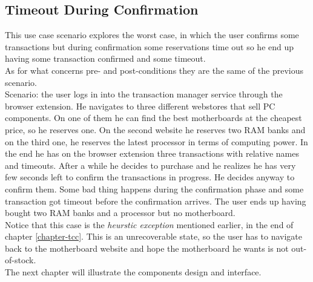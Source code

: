 \subsection{Timeout During Confirmation}
This use case scenario explores the worst case, in which the user confirms some transactions but during confirmation some reservations time out so he end up having some transaction confirmed and some timeout.\\
As for what concerns pre- and post-conditions they are the same of the previous scenario.\\
Scenario: the user logs in into the transaction manager service through the browser extension. He navigates to three different webstores that sell PC components. On one of them he can find the best motherboards at the cheapest price, so he reserves one. On the second website he reserves two RAM banks and on the third one, he reserves the latest processor in terms of computing power. In the end he has on the browser extension three transactions with relative names and timeouts. After a while he decides to purchase and he realizes he has very few seconds left to confirm the transactions in progress. He decides anyway to confirm them. Some bad thing happens during the confirmation phase and some transaction got timeout before the confirmation arrives. The user ends up having bought two RAM banks and a processor but no motherboard.\\
Notice that this case is the \textit{heurstic exception} mentioned earlier, in the end of chapter \ref{chapter-tcc}. This is an unrecoverable state, so the user has to navigate back to the motherboard website and hope the motherboard he wants is not out-of-stock.\\

The next chapter will illustrate the components design and interface.